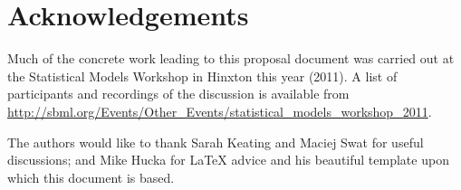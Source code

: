 \documentclass[draftspec]{sbmlpkgspec}
\begin{document}
\section{Acknowledgements}

Much of the concrete work leading to this proposal document
was carried out at the Statistical Models Workshop in Hinxton this
year (2011). A list of participants and recordings of the discussion
is available from
\url{http://sbml.org/Events/Other_Events/statistical_models_workshop_2011}.

The authors would like to thank Sarah Keating and Maciej Swat for
useful discussions; and Mike Hucka for \LaTeX{} advice and his
beautiful template upon which this document is based.



\end{document}
